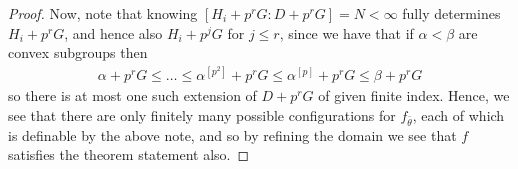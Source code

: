 \documentclass[a4paper,11pt]{article}
\begin{document}
\begin{proof}
    Now, note that knowing $[H_i+p^rG:D+p^rG] = N<\infty$ fully determines $H_i+p^rG$, and hence also $H_i+p^jG$ for $j\leq r$, since we have that if $\alpha <\beta$ are convex subgroups then
    \begin{align*}
        \alpha+p^rG\leq \dots\leq \alpha^{[p^2]}+p^rG\leq\alpha^{[p]}+p^rG\leq\beta+p^rG
    \end{align*}
    so there is at most one such extension of $D+p^rG$ of given finite index.
    Hence, we see that there are only finitely many possible configurations for $f_{\bar\theta}$, each of which is definable by the above note, and so by refining the domain we see that $f$ satisfies the theorem statement also.    
\end{proof}
\end{document}
